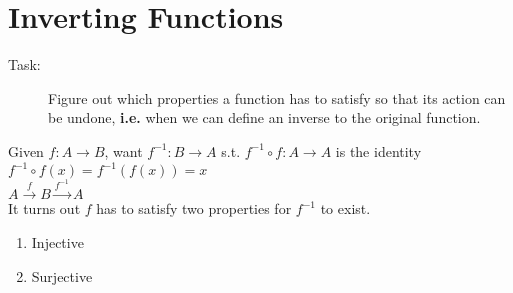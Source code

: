 \documentclass[10pt]{article}
\begin{document}
	\section{Inverting Functions}
	\begin{description}
		\item[Task:] Figure out which properties a function has to satisfy so that its action can be undone, \textbf{i.e.} when we can define an inverse to the original function.
	\end{description}
	Given $f: A \rightarrow B$, want $f^{-1}: B \rightarrow A$ s.t. $f^{-1} \circ f: A \rightarrow A$ is the identity $f^{-1} \circ f(x) = f^{-1}(f(x)) = x$ \\
	$A \overset{f}{\rightarrow} B \overset{f^{-1}}{\rightarrow} A$ \\
	It turns out $f$ has to satisfy two properties for $f^{-1}$ to exist.
	\begin{enumerate}
		\item Injective
		\item Surjective
	\end{enumerate}
\end{document}
